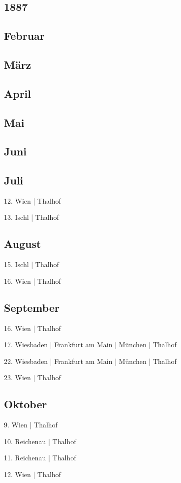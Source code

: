 \documentclass[twoside=false,titlepage=false,open=any, parskip=never, fontsize=10pt, headings=small, chapterprefix=false, appendixprefix=false, DIV=15]{scrbook}
\begin{document}
\begin{multicols}{3}
            \chapter*{1887}
            \section*{Februar}
            \section*{März}
            \section*{April}
            \section*{Mai}
            \section*{Juni}
            \section*{Juli}
            12. Wien | Thalhof\par
            13. Ischl | Thalhof\par
            \section*{August}
            15. Ischl | Thalhof\par
            16. Wien | Thalhof\par
            \section*{September}
            16. Wien | Thalhof\par
            17. Wiesbaden | Frankfurt am Main | München | Thalhof\par
            22. Wiesbaden | Frankfurt am Main | München | Thalhof\par
            23. Wien | Thalhof\par
            \section*{Oktober}
            9. Wien | Thalhof\par
            10. Reichenau | Thalhof\par
            11. Reichenau | Thalhof\par
            12. Wien | Thalhof\par

\end{multicols}
\end{document}
